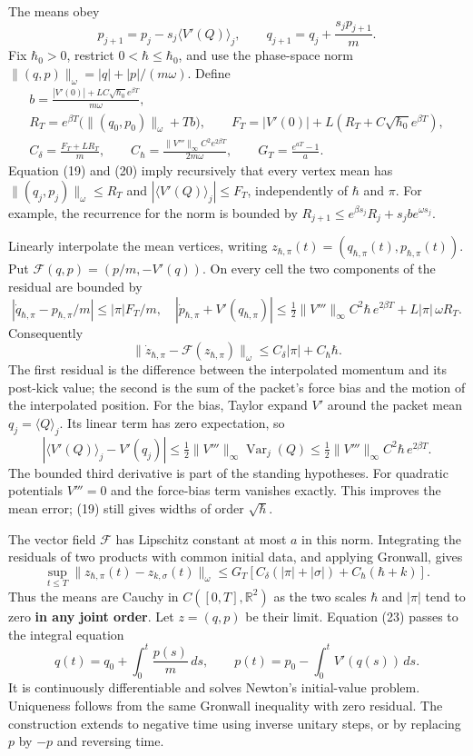 \documentclass[11pt,a4paper]{article}
\begin{document}
The means obey \[p_{j+1}=p_j-s_j\langle V'(Q)\rangle_j,\qquad
 q_{j+1}=q_j+\frac{s_jp_{j+1}}m.\tag{20}\] Fix \(\hbar_0>0\), restrict
\(0<\hbar\le \hbar_0\), and use the phase-space norm
\(\|(q,p)\|_\omega=|q|+|p|/(m\omega)\). Define \[\begin{gathered}
 b=\frac{|V'(0)|+LC\sqrt{\hbar_0}e^{\beta T}}{m\omega},\\
 R_T=e^{\beta T}\big(\|(q_0,p_0)\|_\omega+Tb\big),\qquad
 F_T=|V'(0)|+L(R_T+C\sqrt{\hbar_0}e^{\beta T}),\\
 C_\delta=\frac{F_T+LR_T}{m},\qquad
 C_\hbar=\frac{\|V'''\|_\infty C^2e^{2\beta T}}{2m\omega},\qquad
 G_T=\frac{e^{aT}-1}{a}.
 \tag{21}
\end{gathered}\] Equation (19) and (20) imply recursively that every
vertex mean has \(\|(q_j,p_j)\|_\omega\le R_T\) and
\(|\langle V'(Q)\rangle_j|\le F_T\), independently of \(\hbar\) and
\(\pi\). For example, the recurrence for the norm is bounded by
\(R_{j+1}\le e^{\beta s_j}R_j+s_jbe^{\omega s_j}\).

Linearly interpolate the mean vertices, writing
\(z_{\hbar,\pi}(t)=(q_{\hbar,\pi}(t),p_{\hbar,\pi}(t))\). Put
\(\mathcal F(q,p)=(p/m,-V'(q))\). On every cell the two components of
the residual are bounded by \[
 |\dot q_{\hbar,\pi}-p_{\hbar,\pi}/m|
     \le |\pi|F_T/m,\quad
 |\dot p_{\hbar,\pi}+V'(q_{\hbar,\pi})|
     \le \tfrac12\|V'''\|_\infty C^2\hbar\,e^{2\beta T}
       +L|\pi|\,\omega R_T.\tag{22}
\] Consequently
\[\|\dot z_{\hbar,\pi}-\mathcal F(z_{\hbar,\pi})\|_\omega
 \le C_\delta|\pi|+C_\hbar \hbar.\tag{23}\] The first residual is the
difference between the interpolated momentum and its post-kick value;
the second is the sum of the packet's force bias and the motion of the
interpolated position. For the bias, Taylor expand \(V'\) around the
packet mean \(q_j=\langle Q\rangle_j\). Its linear term has zero
expectation, so \[
 |\langle V'(Q)\rangle_j-V'(q_j)|
 \le\tfrac12\|V'''\|_\infty\operatorname{Var}_j(Q)
 \le\tfrac12\|V'''\|_\infty C^2\hbar\,e^{2\beta T}.\tag{23a}
\] The bounded third derivative is part of the standing hypotheses. For
quadratic potentials \(V'''=0\) and the force-bias term vanishes
exactly. This improves the mean error; (19) still gives widths of order
\(\sqrt \hbar\).

The vector field \(\mathcal F\) has Lipschitz constant at most \(a\) in
this norm. Integrating the residuals of two products with common initial
data, and applying Gronwall, gives \[
 \sup_{t\le T}\|z_{\hbar,\pi}(t)-z_{k,\sigma}(t)\|_\omega
 \le G_T\!\left[
 C_\delta(|\pi|+|\sigma|)
 +C_\hbar(\hbar+k)\right].\tag{24}
\] Thus the means are Cauchy in \(C([0,T],\mathbb R^2)\) as the two
scales \(\hbar\) and \(|\pi|\) tend to zero \textbf{in any joint order}.
Let \(z=(q,p)\) be their limit. Equation (23) passes to the integral
equation \[q(t)=q_0+\int_0^t\frac{p(s)}m\,ds,\qquad
 p(t)=p_0-\int_0^tV'(q(s))\,ds.\tag{25}\] It is continuously
differentiable and solves Newton's initial-value problem. Uniqueness
follows from the same Gronwall inequality with zero residual. The
construction extends to negative time using inverse unitary steps, or by
replacing \(p\) by \(-p\) and reversing time.
\end{document}
